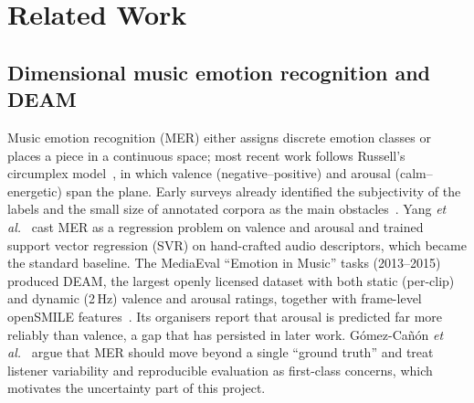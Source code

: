 \section{Related Work}
\label{sec:related}

\subsection{Dimensional music emotion recognition and DEAM}
Music emotion recognition (MER) either assigns discrete emotion classes or
places a piece in a continuous space; most recent work follows Russell's
circumplex model~\cite{russell1980}, in which valence (negative--positive) and
arousal (calm--energetic) span the plane. Early surveys already identified the
subjectivity of the labels and the small size of annotated corpora as the main
obstacles~\cite{kim2010}. Yang \emph{et al.}~\cite{yang2008} cast MER as a
regression problem on valence and arousal and trained support vector regression
(SVR) on hand-crafted audio descriptors, which became the standard baseline.
The MediaEval ``Emotion in Music'' tasks (2013--2015) produced DEAM, the largest
openly licensed dataset with both static (per-clip) and dynamic (2\,Hz) valence
and arousal ratings, together with frame-level openSMILE
features~\cite{aljanaki2017,eyben2010}. Its organisers report that arousal is
predicted far more reliably than valence, a gap that has persisted in later
work. G\'omez-Ca\~n\'on \emph{et al.}~\cite{gomezcanon2021} argue that MER
should move beyond a single ``ground truth'' and treat listener variability and
reproducible evaluation as first-class concerns, which motivates the
uncertainty part of this project.

